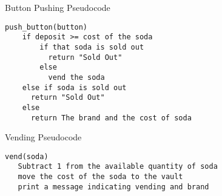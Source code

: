 \documentclass[]{beamer}
\begin{document}
\begin{frame}[fragile]{Button Pushing Pseudocode}
    \begin{BVerbatim}
push_button(button) 
    if deposit >= cost of the soda 
        if that soda is sold out
          return "Sold Out"
        else 
          vend the soda
    else if soda is sold out
      return "Sold Out"
    else
      return The brand and the cost of soda
    \end{BVerbatim}
\end{frame}

\begin{frame}[fragile]{Vending Pseudocode}
    \begin{BVerbatim}
vend(soda)
   Subtract 1 from the available quantity of soda
   move the cost of the soda to the vault
   print a message indicating vending and brand
    \end{BVerbatim}
\end{frame}
\end{document}
